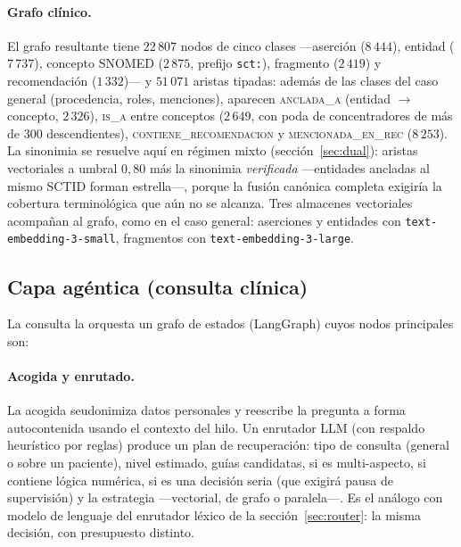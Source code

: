 \documentclass[11pt,a4paper]{article}
\begin{document}
\paragraph{Grafo clínico.}
El grafo resultante tiene $22\,807$ nodos de cinco clases ---aserción
($8\,444$), entidad ($7\,737$), concepto SNOMED ($2\,875$, prefijo
\texttt{sct:}), fragmento ($2\,419$) y recomendación ($1\,332$)--- y
$51\,071$ aristas tipadas: además de las clases del caso general
(procedencia, roles, menciones), aparecen \textsc{anclada\_a} (entidad
$\to$ concepto, $2\,326$), \textsc{is\_a} entre conceptos ($2\,649$, con
poda de concentradores de más de $300$ descendientes),
\textsc{contiene\_recomendacion} y \textsc{mencionada\_en\_rec}
($8\,253$). La sinonimia se resuelve aquí en régimen mixto
(sección~\ref{sec:dual}): aristas vectoriales a umbral $0{,}80$ más la
sinonimia \emph{verificada} ---entidades ancladas al mismo SCTID forman
estrella---, porque la fusión canónica completa exigiría la cobertura
terminológica que aún no se alcanza. Tres almacenes vectoriales acompañan
al grafo, como en el caso general: aserciones y entidades con
\texttt{text-embedding-3-small}, fragmentos con
\texttt{text-embedding-3-large}.

\subsection{Capa agéntica (consulta clínica)}
\label{sec:gesida-consulta}

La consulta la orquesta un grafo de estados (LangGraph) cuyos nodos
principales son:

\paragraph{Acogida y enrutado.}
La acogida seudonimiza datos personales y reescribe la pregunta a forma
autocontenida usando el contexto del hilo. Un enrutador LLM (con respaldo
heurístico por reglas) produce un plan de recuperación: tipo de consulta
(general o sobre un paciente), nivel estimado, guías candidatas, si es
multi-aspecto, si contiene lógica numérica, si es una decisión seria (que
exigirá pausa de supervisión) y la estrategia ---vectorial, de grafo o
paralela---. Es el análogo con modelo de lenguaje del enrutador léxico de
la sección~\ref{sec:router}: la misma decisión, con presupuesto distinto.
\end{document}
